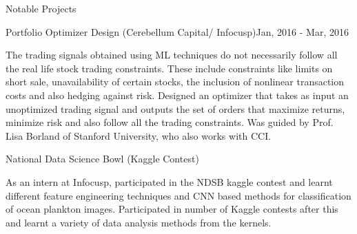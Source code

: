 \documentclass{resume} %
\begin{document}
\begin{rSection}{Notable Projects}
			\begin{rSubsection}{Portfolio Optimizer Design  (Cerebellum Capital/ Infocusp)}{Jan, 2016 - Mar, 2016}{}{}	{}
			\item The trading signals obtained using ML techniques do not necessarily follow all the real life stock trading constraints. These include constraints like limits on short sale, unavailability of certain stocks, the inclusion of nonlinear transaction costs and also hedging against risk. Designed an optimizer that takes as input an unoptimized trading signal and outputs the set of orders that maximize returns, minimize risk and also follow all the trading constraints. Was guided by Prof. Lisa Borland of Stanford University, who also works with CCI.
			\end{rSubsection}
			\vspace{0.1 in}
			
			\begin{rSubsection}{National Data Science Bowl (Kaggle Contest)}{}{}{}	{}
			\item As an intern at Infocusp, participated in the NDSB kaggle contest and learnt different feature engineering techniques and CNN based methods for classification of ocean plankton images. Participated in number of Kaggle contests after this and learnt a variety of data analysis methods from the kernels.
			\end{rSubsection}
			
			\vspace{0.1 in}
		\end{rSection}
		
\end{document}
